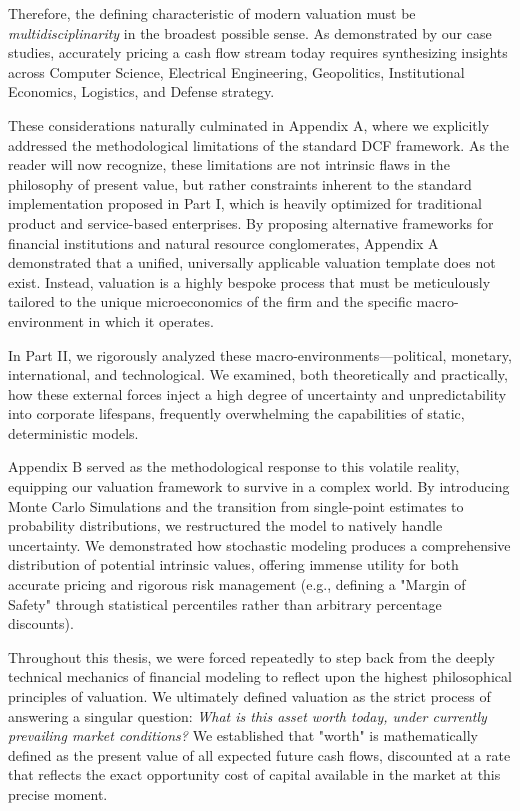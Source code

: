 Therefore, the defining characteristic of modern valuation must be \textit{multidisciplinarity} in the broadest possible sense. As demonstrated by our case studies, accurately pricing a cash flow stream today requires synthesizing insights across Computer Science, Electrical Engineering, Geopolitics, Institutional Economics, Logistics, and Defense strategy.

These considerations naturally culminated in Appendix A, where we explicitly addressed the methodological limitations of the standard DCF framework. As the reader will now recognize, these limitations are not intrinsic flaws in the philosophy of present value, but rather constraints inherent to the standard implementation proposed in Part I, which is heavily optimized for traditional product and service-based enterprises. By proposing alternative frameworks for financial institutions and natural resource conglomerates, Appendix A demonstrated that a unified, universally applicable valuation template does not exist. Instead, valuation is a highly bespoke process that must be meticulously tailored to the unique microeconomics of the firm and the specific macro-environment in which it operates.

In Part II, we rigorously analyzed these macro-environments—political, monetary, international, and technological. We examined, both theoretically and practically, how these external forces inject a high degree of uncertainty and unpredictability into corporate lifespans, frequently overwhelming the capabilities of static, deterministic models.

Appendix B served as the methodological response to this volatile reality, equipping our valuation framework to survive in a complex world. By introducing Monte Carlo Simulations and the transition from single-point estimates to probability distributions, we restructured the model to natively handle uncertainty. We demonstrated how stochastic modeling produces a comprehensive distribution of potential intrinsic values, offering immense utility for both accurate pricing and rigorous risk management (e.g., defining a "Margin of Safety" through statistical percentiles rather than arbitrary percentage discounts).

Throughout this thesis, we were forced repeatedly to step back from the deeply technical mechanics of financial modeling to reflect upon the highest philosophical principles of valuation. We ultimately defined valuation as the strict process of answering a singular question: \textit{What is this asset worth today, under currently prevailing market conditions?} We established that "worth" is mathematically defined as the present value of all expected future cash flows, discounted at a rate that reflects the exact opportunity cost of capital available in the market at this precise moment.

